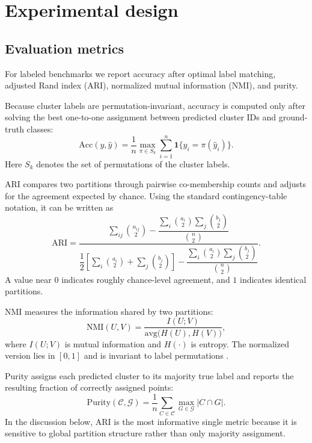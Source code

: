 \documentclass[11pt]{article}
\theoremstyle{plain}
\theoremstyle{definition}
\begin{document}
\section{Experimental design}
\subsection{Evaluation metrics}
For labeled benchmarks we report accuracy after optimal label matching, adjusted Rand index (ARI), normalized mutual information (NMI), and purity.

Because cluster labels are permutation-invariant, accuracy is computed only after solving the best one-to-one assignment between predicted cluster IDs and ground-truth classes:
\[
\mathrm{Acc}(y,\hat y)=\frac{1}{n}\max_{\pi\in S_k}\sum_{i=1}^n \mathbf{1}\{y_i = \pi(\hat y_i)\}.
\]
Here $S_k$ denotes the set of permutations of the cluster labels.

ARI compares two partitions through pairwise co-membership counts and adjusts for the agreement expected by chance. Using the standard contingency-table notation, it can be written as \cite{hubert1985comparing}
\[
\mathrm{ARI}=
\frac{
\sum_{ij} \binom{n_{ij}}{2} -
\dfrac{\sum_i \binom{a_i}{2} \sum_j \binom{b_j}{2}}{\binom{n}{2}}
}{
\dfrac{1}{2}\left[\sum_i \binom{a_i}{2}+\sum_j \binom{b_j}{2}\right]-
\dfrac{\sum_i \binom{a_i}{2} \sum_j \binom{b_j}{2}}{\binom{n}{2}}
}.
\]
A value near $0$ indicates roughly chance-level agreement, and $1$ indicates identical partitions.

NMI measures the information shared by two partitions:
\[
\mathrm{NMI}(U,V)=\frac{I(U;V)}{\mathrm{avg}\bigl(H(U),H(V)\bigr)},
\]
where $I(U;V)$ is mutual information and $H(\cdot)$ is entropy. The normalized version lies in $[0,1]$ and is invariant to label permutations \cite{sklearnNMI}.

Purity assigns each predicted cluster to its majority true label and reports the resulting fraction of correctly assigned points:
\[
\mathrm{Purity}(\mathcal{C},\mathcal{G}) = \frac{1}{n}\sum_{C\in \mathcal{C}} \max_{G\in \mathcal{G}} |C \cap G|.
\]
In the discussion below, ARI is the most informative single metric because it is sensitive to global partition structure rather than only majority assignment.
\end{document}
